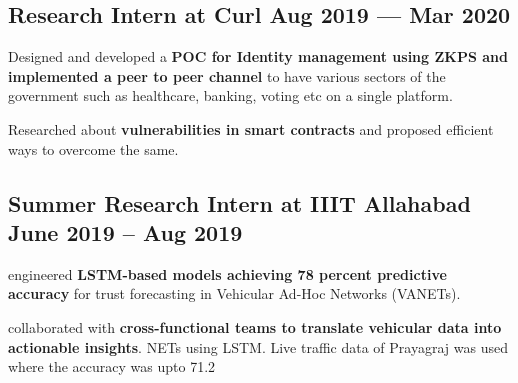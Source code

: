 \subsection{{Research Intern at Curl \hfill Aug 2019 --- Mar 2020}}
\begin{zitemize}
\item Designed and developed a \textbf{POC for Identity management using ZKPS and implemented a peer to peer channel} to have various sectors of the government such as healthcare, banking, voting etc on a single platform.
\item Researched about \textbf{vulnerabilities in smart contracts} and proposed efficient ways to overcome the same.
\end{zitemize}

\subsection{{Summer Research Intern at IIIT Allahabad \hfill June 2019 – Aug 2019}}
\begin{zitemize}
\item engineered \textbf{LSTM-based models achieving 78 percent predictive accuracy} for trust forecasting in Vehicular
Ad-Hoc Networks (VANETs).
\item collaborated with \textbf{cross-functional teams to translate vehicular data into actionable insights}. NETs using LSTM. Live traffic data of Prayagraj was used where the accuracy was upto 71.2%
\end{zitemize}